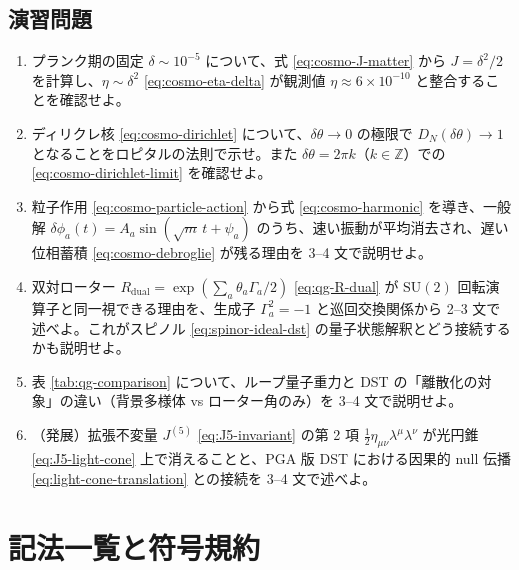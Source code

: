 \documentclass[dvipdfmx,a4paper,oneside]{jsbook}
\numberwithin{equation}{chapter}
\begin{document}
\section*{演習問題}

\begin{enumerate}[leftmargin=2em]
  \item プランク期の固定 \(\delta \sim 10^{-5}\) について、式 \eqref{eq:cosmo-J-matter} から \(J = \delta^2/2\) を計算し、\(\eta \sim \delta^2\) \eqref{eq:cosmo-eta-delta} が観測値 \(\eta \approx 6 \times 10^{-10}\) と整合することを確認せよ。

  \item ディリクレ核 \eqref{eq:cosmo-dirichlet} について、\(\delta\theta \to 0\) の極限で \(D_N(\delta\theta) \to 1\) となることをロピタルの法則で示せ。また \(\delta\theta = 2\pi k\)（\(k \in \mathbb{Z}\)）での \eqref{eq:cosmo-dirichlet-limit} を確認せよ。

  \item 粒子作用 \eqref{eq:cosmo-particle-action} から式 \eqref{eq:cosmo-harmonic} を導き、一般解 \(\delta\phi_a(t) = A_a\sin(\sqrt{m}\,t + \psi_a)\) のうち、速い振動が平均消去され、遅い位相蓄積 \eqref{eq:cosmo-debroglie} が残る理由を 3--4 文で説明せよ。

  \item 双対ローター \(R_{\mathrm{dual}} = \exp(\sum_a \theta_a \Gamma_a/2)\) \eqref{eq:qg-R-dual} が \(\mathrm{SU}(2)\) 回転演算子と同一視できる理由を、生成子 \(\Gamma_a^2 = -1\) と巡回交換関係から 2--3 文で述べよ。これがスピノル \eqref{eq:spinor-ideal-dst} の量子状態解釈とどう接続するかも説明せよ。

  \item 表 \ref{tab:qg-comparison} について、ループ量子重力と DST の「離散化の対象」の違い（背景多様体 vs ローター角のみ）を 3--4 文で説明せよ。

  \item （発展）拡張不変量 \(J^{(5)}\) \eqref{eq:J5-invariant} の第 2 項 \(\tfrac{1}{2}\eta_{\mu\nu}\lambda^\mu\lambda^\nu\) が光円錐 \eqref{eq:J5-light-cone} 上で消えることと、PGA 版 DST における因果的 null 伝播 \eqref{eq:light-cone-translation} との接続を 3--4 文で述べよ。
\end{enumerate}

\newpage

\appendix

\chapter{記法一覧と符号規約}
\end{document}
